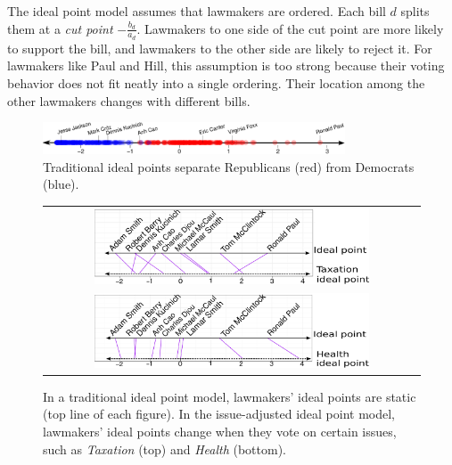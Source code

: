 The ideal point model assumes that lawmakers are ordered.  Each bill
$d$ splits them at a \emph{cut point} $-\frac{b_d}{a_d}$.  Lawmakers
to one side of the cut point are more likely to support the bill, and
lawmakers to the other side are likely to reject it.  For lawmakers
like Paul and Hill, this assumption is too strong because
their voting behavior does not fit neatly into a single ordering.
Their location among the other lawmakers changes with different bills.
\begin{figure}
  \begin{center}
    \vspace{-10pt}
    \includegraphics[width=0.8\textwidth,height=0.1\textwidth]{chapter_spatial_voting_with_text/figures/3393_example_ideal_points_final.pdf}
    \vspace{-10pt}
  \end{center}
  \caption{Traditional ideal points separate Republicans (red) from Democrats (blue).}
  \label{fig:classic_ideal_points}
  \vspace{-5pt}
\end{figure}

\begin{figure}
  \center
  \begin{tabular}{c}
  \includegraphics[width=0.75\textwidth]{chapter_spatial_voting_with_text/figures/3393_example_ideal_points_taxation.pdf} \\
  \includegraphics[width=0.75\textwidth]{chapter_spatial_voting_with_text/figures/3393_example_ideal_points_health.pdf} \\
  \end{tabular}
  \caption{In a traditional ideal point model, lawmakers' ideal points
    are static (top line of each figure).  In the issue-adjusted ideal point model, lawmakers'
    ideal points change when they vote on certain issues, such as
    \emph{Taxation} (top) and \emph{Health} (bottom).}
  \label{fig:moving_ideal_points}
\end{figure}

